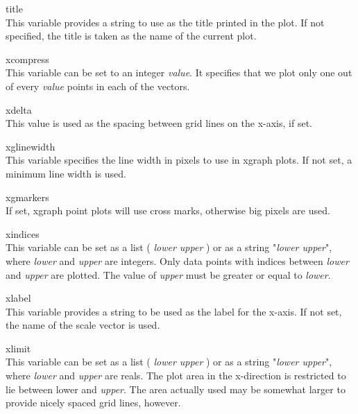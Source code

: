 \begin{description}
\item{\et title}\\
This variable provides a string to use as the title printed in the
plot.  If not specified, the title is taken as the name of the current
plot.

\item{\et xcompress}\\
This variable can be set to an integer {\it value}.  It specifies that
we plot only one out of every {\it value} points in each of the
vectors.

\item{\et xdelta}\\
This value is used as the spacing between grid lines on the x-axis, if
set.

\item{\et xglinewidth}\\
This variable specifies the line width in pixels to use in {\cb
xgraph} plots.  If not set, a minimum line width is used.

\item{\et xgmarkers}\\
If set, {\cb xgraph} point plots will use cross marks, otherwise big
pixels are used.

\item{\et xindices}\\
This variable can be set as a list {\vt (} {\it lower upper} {\vt )}
or as a string {\vt "}{\it lower upper}{\vt "}, where {\it lower} and
{\it upper} are integers.  Only data points with indices between {\it
lower} and {\it upper} are plotted.  The value of {\it upper} must be
greater or equal to {\it lower}.

\item{\et xlabel}\\
This variable provides a string to be used as the label for the
x-axis.  If not set, the name of the scale vector is used.

\item{\et xlimit}\\
This variable can be set as a list {\vt (} {\it lower upper} {\vt )}
or as a string {\vt "}{\it lower upper}{\vt "}, where {\it lower} and
{\it upper} are reals.  The plot area in the x-direction is restricted
to lie between {\vt lower} and {\it upper}.  The area actually used
may be somewhat larger to provide nicely spaced grid lines, however.


\end{description}
